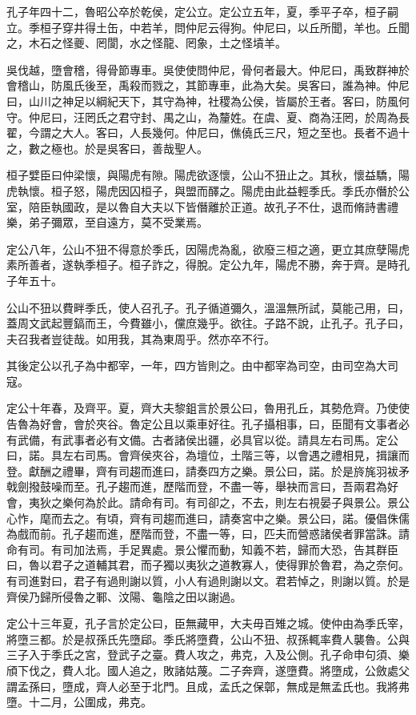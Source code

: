 孔子年四十二，魯昭公卒於乾侯，定公立。定公立五年，夏，季平子卒，桓子嗣立。季桓子穿井得土缶，中若羊，問仲尼云得狗。仲尼曰，以丘所聞，羊也。丘聞之，木石之怪夔、罔閬，水之怪龍、罔象，土之怪墳羊。

吳伐越，墮會稽，得骨節專車。吳使使問仲尼，骨何者最大。仲尼曰，禹致群神於會稽山，防風氏後至，禹殺而戮之，其節專車，此為大矣。吳客曰，誰為神。仲尼曰，山川之神足以綱紀天下，其守為神，社稷為公侯，皆屬於王者。客曰，防風何守。仲尼曰，汪罔氏之君守封、禺之山，為釐姓。在虞、夏、商為汪罔，於周為長翟，今謂之大人。客曰，人長幾何。仲尼曰，僬僥氏三尺，短之至也。長者不過十之，數之極也。於是吳客曰，善哉聖人。

桓子嬖臣曰仲梁懷，與陽虎有隙。陽虎欲逐懷，公山不狃止之。其秋，懷益驕，陽虎執懷。桓子怒，陽虎因囚桓子，與盟而醳之。陽虎由此益輕季氏。季氏亦僭於公室，陪臣執國政，是以魯自大夫以下皆僭離於正道。故孔子不仕，退而脩詩書禮樂，弟子彌眾，至自遠方，莫不受業焉。

定公八年，公山不狃不得意於季氏，因陽虎為亂，欲廢三桓之適，更立其庶孽陽虎素所善者，遂執季桓子。桓子詐之，得脫。定公九年，陽虎不勝，奔于齊。是時孔子年五十。

公山不狃以費畔季氏，使人召孔子。孔子循道彌久，溫溫無所試，莫能己用，曰，蓋周文武起豐鎬而王，今費雖小，儻庶幾乎。欲往。子路不說，止孔子。孔子曰，夫召我者豈徒哉。如用我，其為東周乎。然亦卒不行。

其後定公以孔子為中都宰，一年，四方皆則之。由中都宰為司空，由司空為大司寇。

定公十年春，及齊平。夏，齊大夫黎鉏言於景公曰，魯用孔丘，其勢危齊。乃使使告魯為好會，會於夾谷。魯定公且以乘車好往。孔子攝相事，曰，臣聞有文事者必有武備，有武事者必有文備。古者諸侯出疆，必具官以從。請具左右司馬。定公曰，諾。具左右司馬。會齊侯夾谷，為壇位，土階三等，以會遇之禮相見，揖讓而登。獻酬之禮畢，齊有司趨而進曰，請奏四方之樂。景公曰，諾。於是旍旄羽袚矛戟劍撥鼓噪而至。孔子趨而進，歷階而登，不盡一等，舉袂而言曰，吾兩君為好會，夷狄之樂何為於此。請命有司。有司卻之，不去，則左右視晏子與景公。景公心怍，麾而去之。有頃，齊有司趨而進曰，請奏宮中之樂。景公曰，諾。優倡侏儒為戲而前。孔子趨而進，歷階而登，不盡一等，曰，匹夫而營惑諸侯者罪當誅。請命有司。有司加法焉，手足異處。景公懼而動，知義不若，歸而大恐，告其群臣曰，魯以君子之道輔其君，而子獨以夷狄之道教寡人，使得罪於魯君，為之奈何。有司進對曰，君子有過則謝以質，小人有過則謝以文。君若悼之，則謝以質。於是齊侯乃歸所侵魯之鄆、汶陽、龜陰之田以謝過。

定公十三年夏，孔子言於定公曰，臣無藏甲，大夫毋百雉之城。使仲由為季氏宰，將墮三都。於是叔孫氏先墮郈。季氏將墮費，公山不狃、叔孫輒率費人襲魯。公與三子入于季氏之宮，登武子之臺。費人攻之，弗克，入及公側。孔子命申句須、樂頎下伐之，費人北。國人追之，敗諸姑蔑。二子奔齊，遂墮費。將墮成，公斂處父謂孟孫曰，墮成，齊人必至于北門。且成，孟氏之保鄣，無成是無孟氏也。我將弗墮。十二月，公圍成，弗克。

